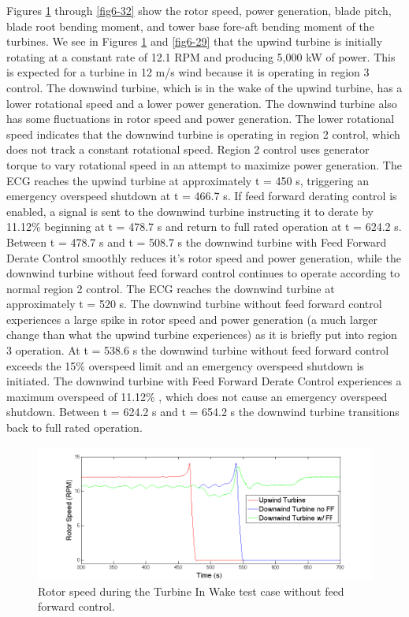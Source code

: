 Figures \ref{fig6-28} through \ref{fig6-32} show the rotor speed, power generation, blade pitch, blade root bending moment, and tower base fore-aft bending moment of the turbines. We see in Figures \ref{fig6-28} and \ref{fig6-29} that the upwind turbine is initially rotating at a constant rate of 12.1 RPM and producing 5,000 kW of power. This is expected for a turbine in 12 m/s wind because it is operating in region 3 control. The downwind turbine, which is in the wake of the upwind turbine,  has a lower rotational speed and a lower power generation. The downwind turbine also has some fluctuations in rotor speed and power generation. The lower rotational speed indicates that the downwind turbine is operating in region 2 control, which does not track a constant rotational speed. Region 2 control uses generator torque to vary rotational speed in an attempt to maximize power generation. The ECG reaches the upwind turbine at approximately t = 450 s, triggering an emergency overspeed shutdown at t = 466.7 s. If feed forward derating control is enabled, a signal is sent to the downwind turbine instructing it to derate by 11.12\% beginning at t = 478.7 s and return to full rated operation at t = 624.2 s. Between t = 478.7 s and t = 508.7 s the downwind turbine with Feed Forward Derate Control smoothly reduces it's rotor speed and power generation, while the downwind turbine without feed forward control continues to operate according to normal region 2 control. The ECG reaches the downwind turbine at approximately t = 520 s. The downwind turbine without feed forward control experiences a large spike in rotor speed and power generation (a much larger change than what the upwind turbine experiences) as it is briefly put into region 3 operation. At t = 538.6 s the downwind turbine without feed forward control exceeds the 15\% overspeed limit and an emergency overspeed shutdown is initiated. The downwind turbine with Feed Forward Derate Control experiences a maximum overspeed of 11.12\% , which does not cause an emergency overspeed shutdown. Between t = 624.2 s and t = 654.2 s the downwind turbine transitions back to full rated operation.

\begin{figure}[ht] 
	\centering
		\includegraphics[width = \linewidth]{Figures/ch6Figures/fig6-28.png}
	\caption{Rotor speed during the Turbine In Wake test case without feed forward control.}
	\label{fig6-28}
\end{figure}

